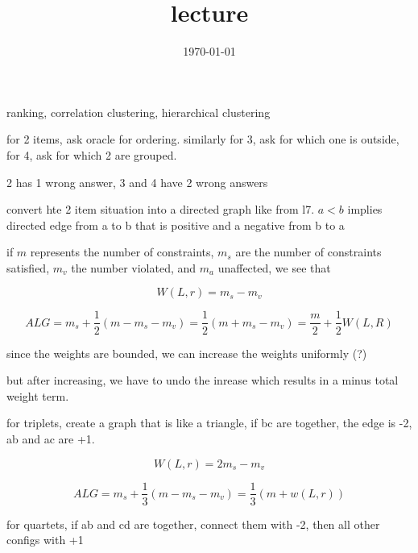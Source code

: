 \documentclass{article}
\title{lecture}
\date{\today}
\theoremstyle{definition}
\begin{document}
\maketitle


ranking, correlation clustering, hierarchical clustering

for 2 items, ask oracle for ordering. similarly for 3, ask for which one is outside, for 4, ask for which 2 are grouped.

2 has 1 wrong answer, 3 and 4 have 2 wrong answers


convert hte 2 item situation into a directed graph like from l7. \(a<b\) implies directed edge from a to b that is positive and a negative from b to a

if \(m\) represents the number of constraints, \(m_s\) are the number of constraints satisfied, \(m_v\) the number violated, and \(m_a\) unaffected, we see that


\begin{equation}
    W(L,r) = m_s-m_v
\end{equation}

\begin{equation}
    ALG = m_s + \frac{1}{2} \left( m-m_s-m_v \right) = \frac{1}{2}(m+m_s-m_v) = \frac{m}{2}+\frac{1}{2}W(L,R)
\end{equation}



since the weights are bounded, we can increase the weights uniformly (?)

but after increasing, we have to undo the inrease which results in a minus total weight term. 


for triplets, create a graph that is like a triangle, if bc are together, the edge is -2, ab and ac are +1. 

\begin{equation}
    W(L,r) = 2m_s-m_v
\end{equation}

\begin{equation}
    ALG = m_s + \frac{1}{3}(m-m_s-m_v) = \frac{1}{3}(m+w(L,r))
\end{equation}

for quartets, if ab and cd are together, connect them with -2, then all other configs with +1
\end{document}
